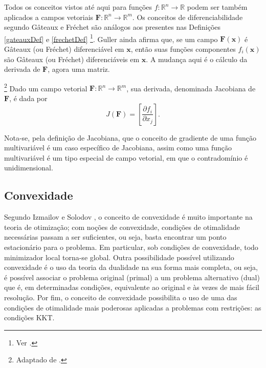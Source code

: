 Todos os conceitos vistos at\'{e} aqui para fun\c{c}\~{o}es $f: \mathbb{R}^{n} \to \mathbb{R}$ podem ser tamb\'{e}m aplicados a campos vetoriais $\mathbf{F}: \mathbb{R}^{n} \to \mathbb{R}^{m}$. Os conceitos de diferenciabilidade segundo G\^{a}teaux e Fr\'{e}chet s\~{a}o an\'{a}logos aos presentes nas Defini\c{c}\~{o}es \ref{gateauxDef} e \ref{frechetDef} \footnote{Ver \cite[pp. 8-9]{guller}.}. Guller ainda afirma que, se um campo $\mathbf{F}(\mathbf{x})$ \'{e} G\^{a}teaux (ou Fr\'{e}chet) diferenci\'{a}vel em $\mathbf{x}$, ent\~{a}o suas fun\c{c}\~{o}es componentes $f_i(\mathbf{x})$ s\~{a}o G\^{a}teaux (ou Fr\'{e}chet) diferenci\'{a}veis em $\mathbf{x}$. A mudan\c{c}a aqui \'{e} o c\'{a}lculo da derivada de $\mathbf{F}$, agora uma matriz.

\begin{definition}\footnote{Adaptado de \cite[p. 9]{guller}.}
Dado um campo vetorial $\mathbf{F}: \mathbb{R}^{n} \to \mathbb{R}^{m}$, sua derivada, denominada Jacobiana de $\mathbf{F}$, \'{e} dada por
\begin{equation}
J(\mathbf{F}) = \left[ \frac{\partial f_i}{\partial x_j} \right].
\end{equation}
\end{definition}

Nota-se, pela defini\c{c}\~{a}o de Jacobiana, que o conceito de gradiente de uma fun\c{c}\~{a}o multivari\'{a}vel \'{e} um caso espec\'{i}fico de Jacobiana, assim como uma fun\c{c}\~{a}o multivari\'{a}vel \'{e} um tipo especial de campo vetorial, em que o contradom\'{i}nio \'{e} unidimensional.

\subsection{Convexidade}
Segundo Izmailov e Solodov \cite{izmailov}, o conceito de convexidade \'{e} muito importante na teoria de otimiza\c{c}\~{a}o; com no\c{c}\~{o}es de convexidade, condi\c{c}\~{o}es de otimalidade necess\'{a}rias passam a ser suficientes, ou seja, basta encontrar um ponto estacion\'{a}rio para o problema. Em particular, sob condi\c{c}\~{o}es de convexidade, todo minimizador local torna-se global. Outra possibilidade poss\'{i}vel utilizando convexidade \'{e} o uso da teoria da dualidade na sua forma mais completa, ou seja, \'{e} poss\'{i}vel associar o problema original (primal) a um problema alternativo (dual) que \'{e}, em determinadas condi\c{c}\~{o}es, equivalente ao original e \`{a}s vezes de mais f\'{a}cil resolu\c{c}\~{a}o. Por fim, o conceito de convexidade possibilita o uso de uma das condi\c{c}\~{o}es de otimalidade mais poderosas aplicadas a problemas com restri\c{c}\~{o}es: as condi\c{c}\~{o}es KKT.

